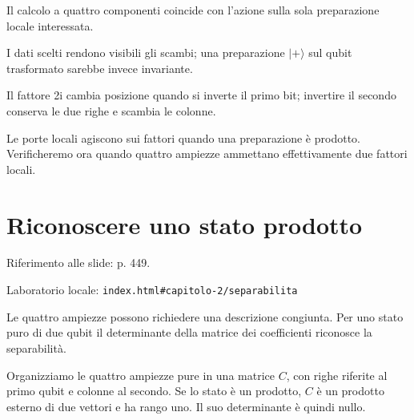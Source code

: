 Il calcolo a quattro componenti coincide con l'azione sulla sola preparazione locale interessata.\par


\label{c2-porte-locali-example-2-step-6}


I dati scelti rendono visibili gli scambi; una preparazione \(|+\rangle \) sul qubit trasformato sarebbe invece invariante.\par



Il fattore 2i cambia posizione quando si inverte il primo bit; invertire il secondo conserva le due righe e scambia le colonne.\par


Le porte locali agiscono sui fattori quando una preparazione è prodotto. Verificheremo ora quando quattro ampiezze ammettano effettivamente due fattori locali.\par



\Needspace{.43\textheight}
\section{Riconoscere uno stato prodotto}
\label{c2-separabilita}

{\sffamily\small\color{Ink!70} Riferimento alle slide: p. 449.\par}

{\sffamily\small\color{Ink!70} Laboratorio locale: \nolinkurl{index.html#capitolo-2/separabilita}\par}

Le quattro ampiezze possono richiedere una descrizione congiunta. Per uno stato puro di due qubit il determinante della matrice dei coefficienti riconosce la separabilità.\par

Organizziamo le quattro ampiezze pure in una matrice \(C\), con righe riferite al primo qubit e colonne al secondo. Se lo stato è un prodotto, \(C\) è un prodotto esterno di due vettori e ha rango uno. Il suo determinante è quindi nullo.\par

